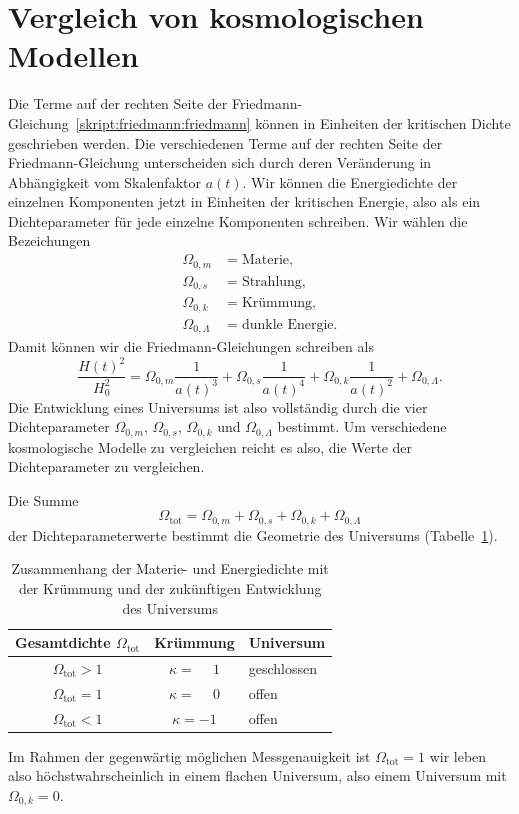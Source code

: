 \section{Vergleich von kosmologischen Modellen}
Die Terme auf der rechten Seite der
Friedmann-Gleichung~\eqref{skript:friedmann:friedmann}
können in Einheiten der kritischen Dichte geschrieben werden.
Die verschiedenen Terme auf der rechten Seite der Friedmann-Gleichung
unterscheiden sich durch deren Veränderung in Abhängigkeit vom
Skalenfaktor $a(t)$.
Wir können die Energiedichte der einzelnen Komponenten jetzt in
Einheiten der kritischen Energie, also als ein Dichteparameter
für jede einzelne Komponenten schreiben.
Wir wählen die Bezeichungen
\begin{align*}
\Omega_{0,m}&=\text{Materie},\\
\Omega_{0,s}&=\text{Strahlung},\\
\Omega_{0,k}&=\text{Krümmung},\\
\Omega_{0,\Lambda}&=\text{dunkle Energie}.
\end{align*}
Damit können wir die Friedmann-Gleichungen schreiben als
\begin{equation}
\frac{H(t)^2}{H_0^2}
=
\Omega_{0,m}\frac1{a(t)^3}
+
\Omega_{0,s}\frac1{a(t)^4}
+
\Omega_{0,k}\frac1{a(t)^2}
+
\Omega_{0,\Lambda}.
\label{skript:friedmann:omegagleichung}
\end{equation}
Die Entwicklung eines Universums ist also vollständig durch die
vier Dichteparameter 
$\Omega_{0,m}$,
$\Omega_{0,s}$,
$\Omega_{0,k}$ und
$\Omega_{0,\Lambda}$
bestimmt.
Um verschiedene kosmologische Modelle zu vergleichen reicht es also,
die Werte der Dichteparameter zu vergleichen.

Die Summe
\[
\Omega_{\text{tot}}
=
\Omega_{0,m}
+
\Omega_{0,s}
+
\Omega_{0,k}
+
\Omega_{0,\Lambda}
\]
der Dichteparameterwerte bestimmt die Geometrie des Universums
(Tabelle~\ref{skript:friedmann:tabelle}).
\begin{table}
\centering
\begin{tabular}{|c|c|l|}
\hline
Gesamtdichte $\Omega_{\text{tot}}$&Krümmung&Universum\\
\hline
$\Omega_{\text{tot}}>1$&$\kappa = \phantom{-}1$&geschlossen\\
$\Omega_{\text{tot}}=1$&$\kappa = \phantom{-}0$&offen\\
$\Omega_{\text{tot}}<1$&$\kappa =-1$&offen\\
\hline
\end{tabular}
\caption{Zusammenhang der Materie- und Energiedichte mit der Krümmung
und der zukünftigen Entwicklung des Universums
\label{skript:friedmann:tabelle}}
\end{table}
Im Rahmen der gegenwärtig möglichen Messgenauigkeit ist
$\Omega_{\text{tot}}=1$ wir leben also höchstwahrscheinlich in
einem flachen Universum, also einem Universum mit $\Omega_{0,k}=0$.

